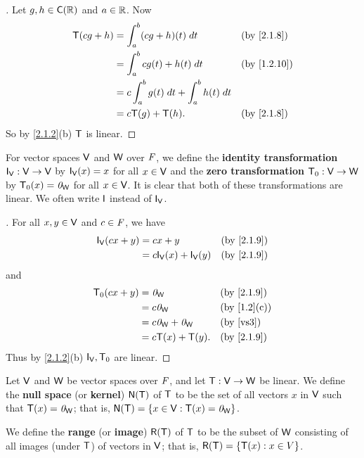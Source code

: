 \begin{proof}[]
  Let \(g, h \in \cfs{\R}\) and \(a \in \mathbb{R}\).
  Now
  \begin{align*}
    \T(cg + h) & = \int_a^b (cg + h)(t) \; dt                  &  & \text{(by \cref{2.1.8})}  \\
               & = \int_a^b cg(t) + h(t) \; dt                 &  & \text{(by \cref{1.2.10})} \\
               & = c \int_a^b g(t) \; dt + \int_a^b h(t) \; dt                                \\
               & = c \T(g) + \T(h).                            &  & \text{(by \cref{2.1.8})}
  \end{align*}
  So by \cref{2.1.2}(b) \(\mathsf{T}\) is linear.
\end{proof}

\begin{eg}\label{2.1.9}
  For vector spaces \(\mathsf{V}\) and \(\mathsf{W}\) over \(\mathit{F}\), we define the \textbf{identity transformation} \(\IT[\V] : \V \to \V\) by \(\IT[\V](x) = x\) for all \(x \in \mathsf{V}\) and the \textbf{zero transformation} \(\mathsf{T}_0 : \mathsf{V} \to \mathsf{W}\) by \(\mathsf{T}_0(x) = \mathit{0}_{\mathsf{W}}\) for all \(x \in \mathsf{V}\).
  It is clear that both of these transformations are linear.
  We often write \(\IT\) instead of \(\IT[\V]\).
\end{eg}

\begin{proof}[]
  For all \(x, y \in \mathsf{V}\) and \(c \in \mathit{F}\), we have
  \begin{align*}
    \IT[\V](cx + y) & = cx + y                    &  & \text{(by \cref{2.1.9})} \\
                    & = c \IT[\V](x) + \IT[\V](y) &  & \text{(by \cref{2.1.9})}
  \end{align*}
  and
  \begin{align*}
    \zT(cx + y) & = \zv_{\W}              &  & \text{(by \cref{2.1.9})}  \\
                & = c \zv_{\W}            &  & \text{(by \cref{1.2}(c))} \\
                & = c \zv_{\W} + \zv_{\W} &  & \text{(by \ref{vs3})}     \\
                & = c\T(x) + \T(y).       &  & \text{(by \cref{2.1.9})}
  \end{align*}
  Thus by \cref{2.1.2}(b) \(\IT[\V], \zT\) are linear.
\end{proof}

\begin{defn}\label{2.1.10}
  Let \(\mathsf{V}\) and \(\mathsf{W}\) be vector spaces over \(\mathit{F}\), and let \(\mathsf{T} : \mathsf{V} \to \mathsf{W}\) be linear.
  We define the \textbf{null space} (or \textbf{kernel}) \(\ns{\T}\) of \(\mathsf{T}\) to be the set of all vectors \(x\) in \(\mathsf{V}\) such that \(\mathsf{T}(x) = \mathit{0}_{\mathsf{W}}\);
  that is, \(\ns{\T} = \set{x \in \V : \T(x) = \zv_{\W}}\).

  We define the \textbf{range} (or \textbf{image}) \(\rg{\T}\) of \(\mathsf{T}\) to be the subset of \(\mathsf{W}\) consisting of all images (under \(\mathsf{T}\)) of vectors in \(\mathsf{V}\);
  that is, \(\rg{\T} = \set{\T(x) : x \in V}\).
\end{defn}

